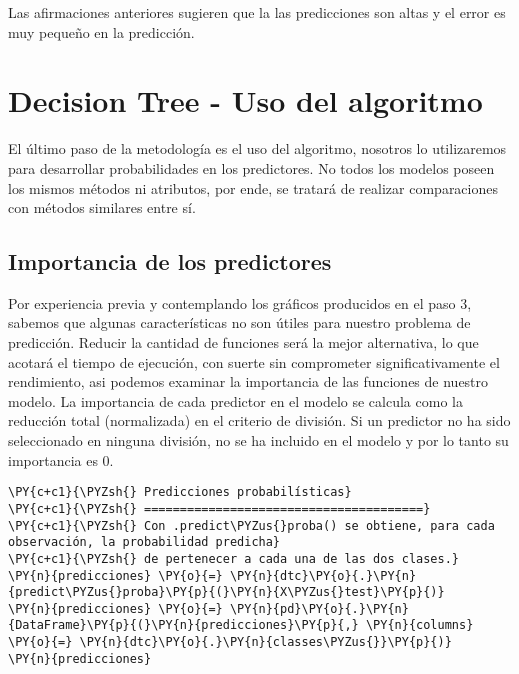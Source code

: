 Las afirmaciones anteriores sugieren que la las predicciones son altas y
el error es muy pequeño en la predicción.

    \hypertarget{decision-tree---uso-del-algoritmo}{%
\section{Decision Tree - Uso del
algoritmo}\label{decision-tree---uso-del-algoritmo}}

El último paso de la metodología es el uso del algoritmo, nosotros lo
utilizaremos para desarrollar probabilidades en los predictores. No
todos los modelos poseen los mismos métodos ni atributos, por ende, se
tratará de realizar comparaciones con métodos similares entre sí.

    \hypertarget{importancia-de-los-predictores}{%
\subsection{Importancia de los
predictores}\label{importancia-de-los-predictores}}

Por experiencia previa y contemplando los gráficos producidos en el paso
3, sabemos que algunas características no son útiles para nuestro
problema de predicción. Reducir la cantidad de funciones será la mejor
alternativa, lo que acotará el tiempo de ejecución, con suerte sin
comprometer significativamente el rendimiento, asi podemos examinar la
importancia de las funciones de nuestro modelo. La importancia de cada
predictor en el modelo se calcula como la reducción total (normalizada)
en el criterio de división. Si un predictor no ha sido seleccionado en
ninguna división, no se ha incluido en el modelo y por lo tanto su
importancia es 0.

    \begin{tcolorbox}[breakable, size=fbox, boxrule=1pt, pad at break*=1mm,colback=cellbackground, colframe=cellborder]
\begin{Verbatim}[commandchars=\\\{\}]
\PY{c+c1}{\PYZsh{} Predicciones probabilísticas}
\PY{c+c1}{\PYZsh{} =======================================}
\PY{c+c1}{\PYZsh{} Con .predict\PYZus{}proba() se obtiene, para cada observación, la probabilidad predicha}
\PY{c+c1}{\PYZsh{} de pertenecer a cada una de las dos clases.}
\PY{n}{predicciones} \PY{o}{=} \PY{n}{dtc}\PY{o}{.}\PY{n}{predict\PYZus{}proba}\PY{p}{(}\PY{n}{X\PYZus{}test}\PY{p}{)}
\PY{n}{predicciones} \PY{o}{=} \PY{n}{pd}\PY{o}{.}\PY{n}{DataFrame}\PY{p}{(}\PY{n}{predicciones}\PY{p}{,} \PY{n}{columns} \PY{o}{=} \PY{n}{dtc}\PY{o}{.}\PY{n}{classes\PYZus{}}\PY{p}{)}
\PY{n}{predicciones}
\end{Verbatim}
\end{tcolorbox}

